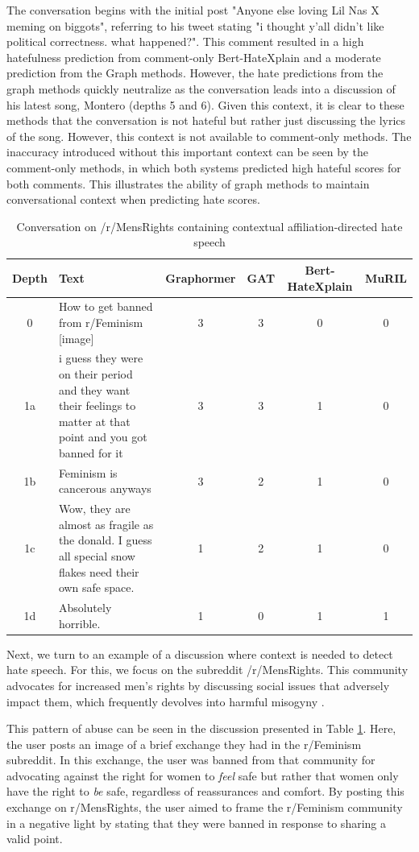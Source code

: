 \documentclass[letterpaper]{article} %
\newcommand{\edit}[1]{{#1}}
\begin{document}
The conversation begins with the initial post "Anyone else loving Lil Nas X meming on biggots", referring to his tweet stating "i thought y'all didn't like political correctness. what happened?". This comment resulted in a high hatefulness prediction from comment-only Bert-HateXplain and a moderate prediction from the Graph methods. However, the hate predictions from the graph methods quickly neutralize as the conversation leads into a discussion of his latest song, Montero (depths 5 and 6). Given this context, it is clear to these methods that the conversation is not hateful but rather just discussing the lyrics of the song. However, this context is not available to comment-only methods. The inaccuracy introduced without this important context can be seen by the comment-only methods, in which both systems predicted high hateful scores for both comments. This illustrates the ability of graph methods to maintain conversational context when predicting hate scores.

\begin{table}
\centering
\caption{Conversation on /r/MensRights containing contextual affiliation-directed hate speech}
\begin{tabular}{c|p{8cm}|c|c|c|c}
Depth & Text & Graphormer & GAT & Bert-HateXplain & MuRIL \\
\hline
\hline
0 & How to get banned from r/Feminism [image] & 3 & 3 & 0 & 0 \\
\hline
1a & i guess they were on their period and they want their feelings to matter at that point and you got banned for it & 3 & 3 & 1 & 0  \\
\hline
1b & Feminism is cancerous anyways & 3 & 2 & 1 & 0  \\
\hline
1c & Wow, they are almost as fragile as the donald. I guess all special snow flakes need their own safe space. & 1 & 2 & 1 & 0 \\
\hline
1d & Absolutely horrible. & 1 & 0 & 1 & 1 \\
\end{tabular}
\label{tab:contextual-mens-rights}
\end{table}
Next, we turn to an example of a discussion where context is needed to detect hate speech. \edit{For this, we focus on the subreddit /r/MensRights.  This community advocates for increased men's rights by discussing social issues that adversely impact them, which frequently devolves into harmful misogyny \cite{socsci5020018}}.

This pattern of abuse can be seen in the discussion presented in Table \ref{tab:contextual-mens-rights}. Here, the user posts an image of a brief exchange they had in the r/Feminism subreddit. In this exchange, the user was banned from that community for advocating against the right for women to \textit{feel} safe but rather that women only have the right to \textit{be} safe, regardless of reassurances and comfort. By posting this exchange on r/MensRights, the user aimed to frame the r/Feminism community in a negative light by stating that they were banned in response to sharing a valid point.
\end{document}
